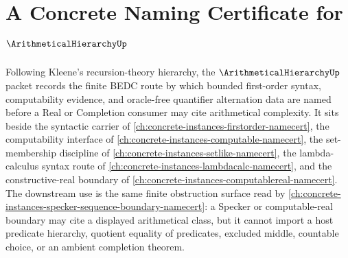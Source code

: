\chapter{A Concrete Naming Certificate for $\ArithmeticalHierarchyUp$}
\label{ch:concrete-instances-arithmetical-hierarchy-namecert}

Following Kleene's recursion-theory hierarchy, the $\ArithmeticalHierarchyUp$ packet records the finite BEDC route by which bounded first-order syntax, computability evidence, and oracle-free quantifier alternation data are named before a Real or Completion consumer may cite arithmetical complexity. It sits beside the syntactic carrier of \autoref{ch:concrete-instances-firstorder-namecert}, the computability interface of \autoref{ch:concrete-instances-computable-namecert}, the set-membership discipline of \autoref{ch:concrete-instances-setlike-namecert}, the lambda-calculus syntax route of \autoref{ch:concrete-instances-lambdacalc-namecert}, and the constructive-real boundary of \autoref{ch:concrete-instances-computablereal-namecert}. The downstream use is the same finite obstruction surface read by \autoref{ch:concrete-instances-specker-sequence-boundary-namecert}: a Specker or computable-real boundary may cite a displayed arithmetical class, but it cannot import a host predicate hierarchy, quotient equality of predicates, excluded middle, countable choice, or an ambient completion theorem.

